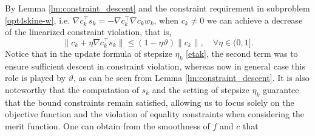 \documentclass[11pt]{article}
\newcommand{\be}{\begin{equation}}
\newcommand{\ee}{\end{equation}}
\begin{document}
By Lemma \ref{lm:constraint_descent} and the constraint requirement in subproblem \eqref{opt4skine-w}, i.e. \(\nabla c_k^\top s_k = - \nabla c_k^\top \nabla c_k w_k\), when $c_k\neq 0$  we can achieve a decrease of the linearized  constraint violation, that is, 
\be\label{re-lc}
\|c_k + \eta \nabla c_k^\top s_k\| \leq (1 - \eta \vartheta) \|c_k\|, \quad \forall \eta\in (0,1].
\ee
Notice that in the update formula of stepsize $\eta_k$ \eqref{etak}, the second term was to ensure sufficient descent in constraint violation, whereas now in general case this role is {played} by \(\vartheta\), as can be seen from Lemma \ref{lm:constraint_descent}. It is also noteworthy that the computation of $ s_k $ and the setting of stepsize $\eta_k$ guarantee that the bound constraints remain satisfied, allowing us to focus solely on the objective function and the violation of equality constraints when considering the merit function. One can obtain from 
 the smoothness of \(f\) and \(c\) that
\end{document}
